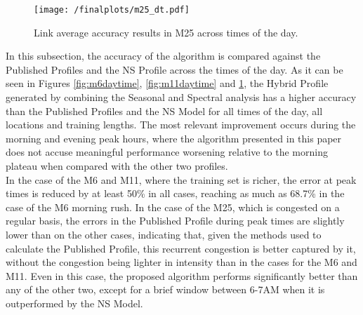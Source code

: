 \documentclass[conference, letterpaper]{IEEEtran}
\begin{document}
\begin{figure}[htbp]
	\centering
	\texttt{[image: /finalplots/m25\_dt.pdf]}
	\caption{Link average accuracy results in M25 across times of the day.}
	\label{fig:m25daytime}
\end{figure}

In this subsection, the accuracy of the algorithm is compared against the Published Profiles and the NS Profile across the times of the day.
As it can be seen in Figures \ref{fig:m6daytime}, \ref{fig:m11daytime} and \ref{fig:m25daytime}, the Hybrid Profile generated by combining the Seasonal and Spectral analysis has a higher accuracy than the Published Profiles and the NS Model for all times of the day, all locations and training lengths. 
The most relevant improvement occurs during the morning and evening peak hours, where the algorithm presented in this paper does not accuse meaningful performance worsening relative to the morning plateau when compared with the other two profiles.\\
In the case of the M6 and M11, where the training set is richer, the error at peak times is reduced by at least 50\% in all cases, reaching as much as 68.7\% in the case of the M6 morning rush.
In the case of the M25, which is congested on a regular basis, the errors in the Published Profile during peak times are slightly lower than on the other cases, indicating that, given the methods used to calculate the Published Profile, this recurrent congestion is better captured by it, without the congestion being lighter in intensity than in the cases for the M6 and M11. 
Even in this case, the proposed algorithm performs significantly better than any of the other two, except for a brief window between 6-7AM when it is outperformed by the NS Model.
\end{document}
